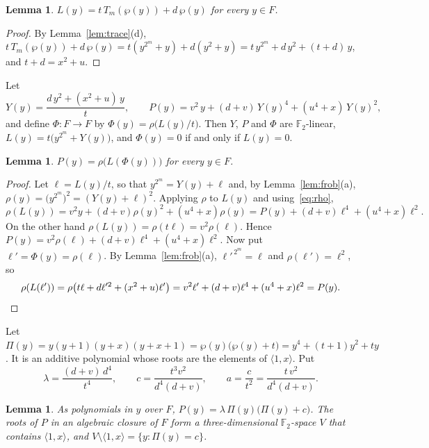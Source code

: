 \documentclass[11pt,a4paper,reqno]{amsart}
\newtheorem{lemma}[theorem]{Lemma}
\theoremstyle{remark}
\numberwithin{equation}{section}
\newcommand{\F}{\mathbb{F}}
\begin{document}
\begin{lemma}\label{lem:Tm}
$L(y)=t\,T_m(\wp(y))+d\,\wp(y)$ for every $y\in F$.
\end{lemma}

\begin{proof}
By Lemma~\ref{lem:trace}(d), $t\,T_m(\wp(y))+d\,\wp(y)=t(y^{2^m}+y)+d(y^2+y)=t\,y^{2^m}+d\,y^2+(t+d)\,y$, and $t+d=x^2+u$.
\end{proof}

Let
\[
Y(y)=\frac{d\,y^2+(x^2+u)\,y}{t},\qquad P(y)=v^2\,y+(d+v)\,Y(y)^4+(u^4+x)\,Y(y)^2 ,
\]
and define $\Phi\colon F\to F$ by $\Phi(y)=\rho\bigl(L(y)/t\bigr)$. Then $Y$, $P$ and $\Phi$ are $\F_2$-linear, $L(y)=t\bigl(y^{2^m}+Y(y)\bigr)$, and $\Phi(y)=0$ if and only if $L(y)=0$.

\begin{lemma}\label{lem:key}
$P(y)=\rho\bigl(L(\Phi(y))\bigr)$ for every $y\in F$.
\end{lemma}

\begin{proof}
Let $\ell=L(y)/t$, so that $y^{2^m}=Y(y)+\ell$ and, by Lemma~\ref{lem:frob}(a), $\rho(y)=\bigl(y^{2^m}\bigr)^2=(Y(y)+\ell)^2$. Applying $\rho$ to $L(y)$ and using~\eqref{eq:rho},
\[
\rho(L(y))=v^2y+(d+v)\rho(y)^2+(u^4+x)\rho(y)=P(y)+(d+v)\ell^4+(u^4+x)\ell^2 .
\]
On the other hand $\rho(L(y))=\rho(t\ell)=v^2\rho(\ell)$. Hence $P(y)=v^2\rho(\ell)+(d+v)\ell^4+(u^4+x)\ell^2$. Now put $\ell'=\Phi(y)=\rho(\ell)$. By Lemma~\ref{lem:frob}(a), $\ell'^{\,2^m}=\ell$ and $\rho(\ell')=\ell^2$, so
\[
\rho(L(\ell'))=\rho\bigl(t\ell+d\ell'^2+(x^2+u)\ell'\bigr)=v^2\ell'+(d+v)\ell^4+(u^4+x)\ell^2=P(y). \qedhere
\]
\end{proof}

Let $\Pi(y)=y(y+1)(y+x)(y+x+1)=\wp(y)\bigl(\wp(y)+t\bigr)=y^4+(t+1)y^2+ty$. It is an additive polynomial whose roots are the elements of $\langle1,x\rangle$. Put
\[
\lambda=\frac{(d+v)\,d^4}{t^4},\qquad c=\frac{t^3v^2}{d^4(d+v)},\qquad a=\frac{c}{t^2}=\frac{t\,v^2}{d^4(d+v)} .
\]

\begin{lemma}\label{lem:factor}
As polynomials in $y$ over $F$, $P(y)=\lambda\,\Pi(y)\bigl(\Pi(y)+c\bigr)$. The roots of $P$ in an algebraic closure of $F$ form a three-dimensional $\F_2$-space $V$ that contains $\langle1,x\rangle$, and $V\setminus\langle1,x\rangle=\{y:\Pi(y)=c\}$.
\end{lemma}
\end{document}
